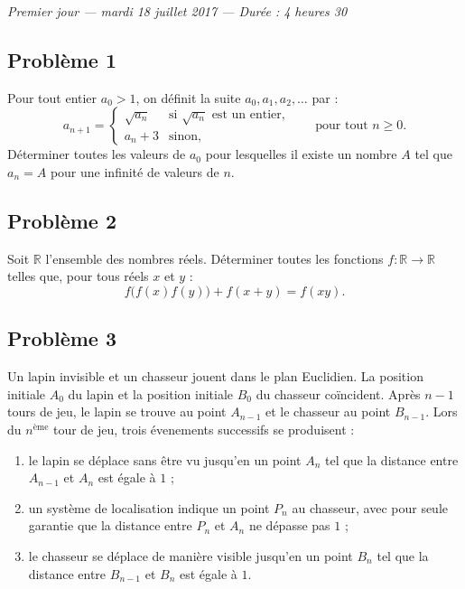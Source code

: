 
\begin{center}
  \emph{Premier jour --- mardi 18 juillet 2017 --- Durée : 4 heures 30}
\end{center}

\subsection*{Problème 1}
Pour tout entier $a_0 > 1$, on définit la suite $a_0, a_1, a_2, \ldots$ par :
\[
a_{n+1} = \begin{cases} \sqrt{a_n} & \text{si } \sqrt{a_n} \text{ est un entier,} \\ a_n + 3 & \text{sinon,} \end{cases} \qquad \text{pour tout } n \geqslant 0.
\]
Déterminer toutes les valeurs de $a_0$ pour lesquelles il existe un nombre $A$ tel que $a_n = A$ pour une
infinité de valeurs de $n$.

\subsection*{Problème 2}
Soit $\mathbb{R}$ l'ensemble des nombres réels. Déterminer toutes les fonctions
$f : \mathbb{R} \to \mathbb{R}$ telles que, pour tous réels $x$ et $y$ :
\[
f\bigl(f(x)f(y)\bigr) + f(x+y) = f(xy).
\]

\subsection*{Problème 3}
Un lapin invisible et un chasseur jouent dans le plan Euclidien. La position initiale $A_0$ du lapin et la
position initiale $B_0$ du chasseur coïncident. Après $n - 1$ tours de jeu, le lapin se trouve au point
$A_{n-1}$ et le chasseur au point $B_{n-1}$. Lors du $n^{\text{ème}}$ tour de jeu, trois évenements successifs
se produisent :
\begin{enumerate}
  \item[(i)] le lapin se déplace sans être vu jusqu'en un point $A_n$ tel que la distance entre $A_{n-1}$ et
  $A_n$ est égale à $1$ ;
  \item[(ii)] un système de localisation indique un point $P_n$ au chasseur, avec pour seule garantie que la
  distance entre $P_n$ et $A_n$ ne dépasse pas $1$ ;
  \item[(iii)] le chasseur se déplace de manière visible jusqu'en un point $B_n$ tel que la distance entre
  $B_{n-1}$ et $B_n$ est égale à $1$.
\end{enumerate}

